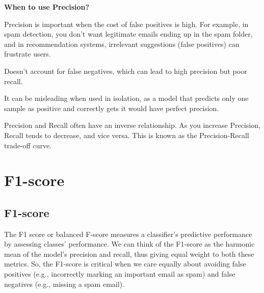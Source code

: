 \textbf{When to use Precision?}

Precision is important when the cost of false positives is high. For example, in spam detection, you don’t want legitimate emails ending up in the spam folder,
and in recommendation systems, irrelevant suggestions (false positives) can frustrate users.

{
\item Doesn't account for false negatives, which can lead to high precision but poor recall.
\item It can be misleading when used in isolation, as a model that predicts only one sample as positive and correctly gets it would have perfect precision.
}

{
    Precision and Recall often have an inverse relationship. As you increase Precision, Recall tends to decrease, and vice versa.
    This is known as the Precision-Recall trade-off curve.
}

\clearpage
\thispagestyle{classificationstyle}
\section{F1-score}
\subsection{F1-score}

The F1 score or balanced F-score measures a classifier's predictive performance by assessing classes' performance. We can think of the F1-score as the harmonic mean of the model’s
precision and recall, thus giving equal weight to both these metrics. So, the F1-score is critical when we care equally about avoiding false positives
(e.g., incorrectly marking an important email as spam) and false negatives (e.g., missing a spam email).


